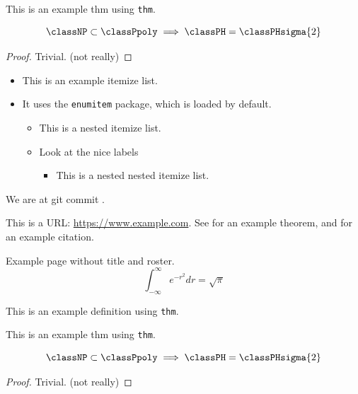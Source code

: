 \documentclass[b5paper, parskip=half-]{scrartcl} %
\begin{document}
    \begin{thm} \label{thm:example2}
        This is an example thm using \texttt{thm}.
    
        \[
            \classNP \subset \classPpoly \implies \classPH = \classPHsigma{2}
        \]
        \begin{proof}
            Trivial. (not really)
        \end{proof}
    \end{thm}

    \begin{itemize}[itemsep=0pt]
        \item This is an example itemize list.
        \item It uses the \texttt{enumitem} package, which is loaded by default.
        \begin{itemize}[itemsep=0pt]
            \item This is a nested itemize list.
            \item Look at the nice labels
            \begin{itemize}[itemsep=0pt]
                \item This is a nested nested itemize list.
            \end{itemize}
        \end{itemize}
    \end{itemize}

    We are at git commit \texttt{\githash\dirtyplus}.


    This is a URL: \href{https://www.example.com}{https://www.example.com}.
    See  for an example theorem, and \cite{graedel1992capturing} for an example citation.
    \printbibliography

    \newpage
    
        Example page without title and roster.
    \[
        \int_{-\infty}^{\infty} e^{-r^2}dr = \sqrt\pi
    \]

    \begin{definition}
        This is an example definition using \texttt{thm}.
    \end{definition}

    \begin{thm} \label{thm:example2}
        This is an example thm using \texttt{thm}.
    
        \[
            \classNP \subset \classPpoly \implies \classPH = \classPHsigma{2}
        \]
        \begin{proof}
            Trivial. (not really)
        \end{proof}
    \end{thm}
\end{document}
